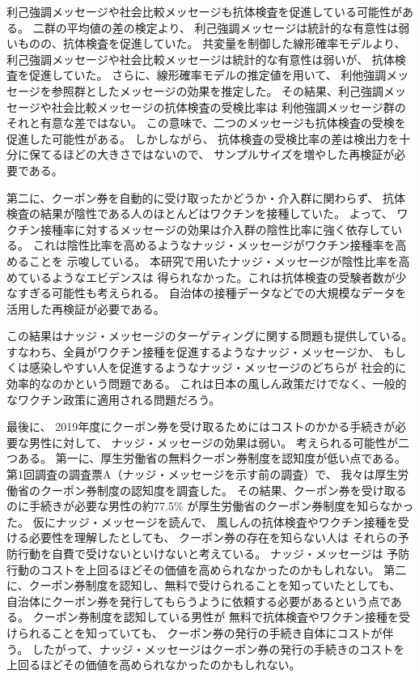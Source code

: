 \documentclass[
  11pt,
  a4paper,
]{article}
\begin{document}
利己強調メッセージや社会比較メッセージも抗体検査を促進している可能性がある。
二群の平均値の差の検定より、
利己強調メッセージは統計的な有意性は弱いものの、抗体検査を促進していた。
共変量を制御した線形確率モデルより、
利己強調メッセージや社会比較メッセージは統計的な有意性は弱いが、
抗体検査を促進していた。
さらに、線形確率モデルの推定値を用いて、
利他強調メッセージを参照群としたメッセージの効果を推定した。
その結果、利己強調メッセージや社会比較メッセージの抗体検査の受検比率は
利他強調メッセージ群のそれと有意な差ではない。
この意味で、二つのメッセージも抗体検査の受検を促進した可能性がある。
しかしながら、
抗体検査の受検比率の差は検出力を十分に保てるほどの大きさではないので、
サンプルサイズを増やした再検証が必要である。

第二に、クーポン券を自動的に受け取ったかどうか・介入群に関わらず、
抗体検査の結果が陰性である人のほとんどはワクチンを接種していた。
よって、
ワクチン接種率に対するメッセージの効果は介入群の陰性比率に強く依存している。
これは陰性比率を高めるようなナッジ・メッセージがワクチン接種率を高めることを
示唆している。
本研究で用いたナッジ・メッセージが陰性比率を高めているようなエビデンスは
得られなかった。これは抗体検査の受験者数が少なすぎる可能性も考えられる。
自治体の接種データなどでの大規模なデータを活用した再検証が必要である。

この結果はナッジ・メッセージのターゲティングに関する問題も提供している。
すなわち、全員がワクチン接種を促進するようなナッジ・メッセージか、
もしくは感染しやすい人を促進するようなナッジ・メッセージのどちらが
社会的に効率的なのかという問題である。
これは日本の風しん政策だけでなく、一般的なワクチン政策に適用される問題だろう。

最後に、
2019年度にクーポン券を受け取るためにはコストのかかる手続きが必要な男性に対して、
ナッジ・メッセージの効果は弱い。
考えられる可能性が二つある。
第一に、厚生労働省の無料クーポン券制度を認知度が低い点である。
第1回調査の調査票A（ナッジ・メッセージを示す前の調査）で、
我々は厚生労働省のクーポン券制度の認知度を調査した。
その結果、クーポン券を受け取るのに手続きが必要な男性の約77.5\%
が厚生労働省のクーポン券制度を知らなかった。
仮にナッジ・メッセージを読んで、
風しんの抗体検査やワクチン接種を受ける必要性を理解したとしても、
クーポン券の存在を知らない人は
それらの予防行動を自費で受けないといけないと考えている。
ナッジ・メッセージは
予防行動のコストを上回るほどその価値を高められなかったのかもしれない。
第二に、クーポン券制度を認知し、無料で受けられることを知っていたとしても、
自治体にクーポン券を発行してもらうように依頼する必要があるという点である。
クーポン券制度を認知している男性が
無料で抗体検査やワクチン接種を受けられることを知っていても、
クーポン券の発行の手続き自体にコストが伴う。
したがって、ナッジ・メッセージはクーポン券の発行の手続きのコストを上回るほどその価値を高められなかったのかもしれない。
\end{document}

